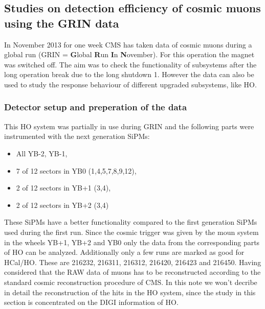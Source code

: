 	\subsection{Studies on detection efficiency of cosmic muons using the GRIN data} 
		In November 2013 for one week CMS has taken data of cosmic muons during a global run (GRIN = \textbf{G}lobal \textbf{R}un \textbf{I}n \textbf{N}ovember).
		For this operation the magnet was switched off.
		The aim was to check the functionality of subsystems after the long operation break due to the long shutdown 1.
		However the data can also be used to study the response behaviour of different upgraded subsystems, like HO.
		\subsubsection{Detector setup and preperation of the data}
			This HO system was partially in use during GRIN and the following parts were instrumented with the next generation SiPMs:
			\begin{itemize}
				\item All YB-2, YB-1,
				\item 7 of 12 sectors in YB0 (1,4,5,7,8,9,12),
				\item 2 of 12 sectors in YB+1 (3,4),
				\item 2 of 12 sectors in YB+2 (3,4)
			\end{itemize}
			These SiPMs have a better functionality compared to the first generation SiPMs used during the first run.
			Since the cosmic trigger was given by the moun system in the wheels YB+1, YB+2 and YB0 only the data from the corresponding parts of HO can be analyzed.
			Additionally only a few runs are marked as good for HCal/HO.
			These are 216232, 216311, 216312, 216420, 216423 and 216450.
			Having considered that the RAW data of muons has to be reconstructed according to the standard cosmic reconstruction procedure of CMS.
			In this note we won't decribe in detail the reconstruction of the hits in the HO system, since the study in this section is concentrated on the DIGI information of HO.
